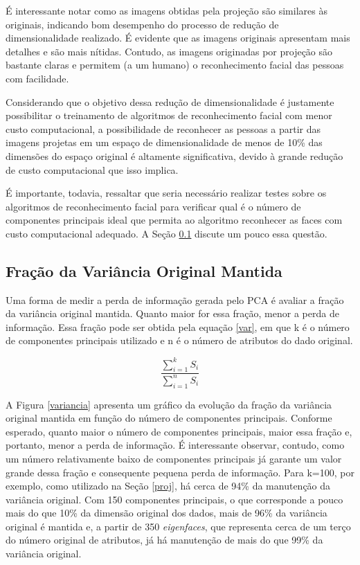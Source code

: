 \documentclass[12pt]{article}
\begin{document}
É interessante notar como as imagens obtidas pela projeção são similares às originais, indicando bom desempenho do processo de redução de dimensionalidade realizado. É evidente que as imagens originais apresentam mais detalhes e são mais nítidas. Contudo, as imagens originadas por projeção são bastante claras e permitem (a um humano) o reconhecimento facial das pessoas com facilidade. 

Considerando que o objetivo dessa redução de dimensionalidade é justamente possibilitar o treinamento de algoritmos de reconhecimento facial com menor custo computacional, a possibilidade de reconhecer as pessoas a partir das imagens projetas em um espaço de dimensionalidade de menos de 10\% das dimensões do espaço original é altamente significativa, devido à grande redução de custo computacional que isso implica.

É importante, todavia, ressaltar que seria necessário realizar testes sobre os algoritmos de reconhecimento facial para verificar qual é o número de componentes principais ideal que permita ao algoritmo reconhecer as faces com custo computacional adequado. A Seção \ref{var_mant} discute um pouco essa questão. 

\subsection{Fração da Variância Original Mantida} \label{var_mant}
Uma forma de medir a perda de informação gerada pelo PCA é avaliar a fração da variância original mantida. Quanto maior for essa fração, menor a perda de informação. Essa fração pode ser obtida pela equação \ref{var}, em que k é o número de componentes principais utilizado e n é o número de atributos do dado original.

\begin{equation} \label{var}
\frac{\sum_{i=1}^k S_i}{\sum_{i=1}^n S_i}
\end{equation}

A Figura \ref{variancia} apresenta um gráfico da evolução da fração da variância original mantida em função do número de componentes principais. Conforme esperado, quanto maior o número de componentes principais, maior essa fração e, portanto, menor a perda de informação. É interessante observar, contudo, como um número relativamente baixo de componentes principais já garante um valor grande dessa fração e consequente pequena perda de informação. Para k=100, por exemplo, como utilizado na Seção \ref{proj}, há cerca de 94\% da manutenção da variância original. Com 150 componentes principais, o que corresponde a pouco mais do que 10\% da dimensão original dos dados, mais de 96\% da variância original é mantida e, a partir de 350 \textit{eigenfaces}, que representa cerca de um terço do número original de atributos, já há manutenção de mais do que 99\% da variância original.
\end{document}
